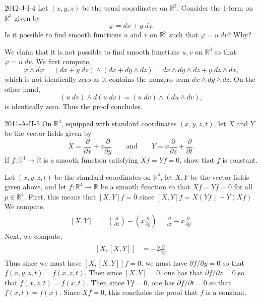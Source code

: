 \documentclass{article}
\begin{document}
	
	\begin{prb}{2012-J-I-4}
		Let $(x, y, z)$ be the usual coordinates on $\mathbb{R}^{3}$. Consider the 1-form on $\mathbb{R}^{3}$ given by 
		\begin{equation*}
			\varphi = dx + y\;dz. 
		\end{equation*}
		Is it possible to find smooth functions $u$ and $v$ on $\mathbb{R}^{3}$ such that $\varphi = u\;dv$? Why? 
	\end{prb}
	We claim that it is not possible to find smooth functions $u, v$ on $\mathbb{R}^{3}$ so that $\varphi = u\;dv$. We first compute, 
	\begin{equation*}
		\varphi \wedge d\varphi = (dx + y\;dz) \wedge (dx + dy \wedge dz) = dx \wedge dy \wedge dz + y\;dz \wedge dx, 
	\end{equation*}
	which is not identically zero as it contains the nonzero term $dx \wedge dy \wedge dz$. On the other hand, 
	\begin{equation*}
		(u\;dv) \wedge d(u\;dv) = (u\;dv) \wedge (du \wedge dv), 
	\end{equation*}
	is identically zero. Thus the proof concludes. 
	
	\begin{prb}{2011-A-II-5}
		On $\mathbb{R}^{4}$, equipped with standard coordinates $(x, y, z, t)$, let $X$ and $Y$ be the vector fields given by 
		\begin{equation*}
			X = \frac{\partial}{\partial x} + z\frac{\partial}{\partial y} \qquad \text{and} \qquad Y = x\frac{\partial}{\partial z} + \frac{\partial}{\partial t}. 
		\end{equation*}
		If $f: \mathbb{R}^{4} \to \mathbb{R}$ is a smooth function satisfying $Xf = Yf = 0$, show that $f$ is constant. 
	\end{prb}
	Let $(x, y, z, t)$ be the standard coordinates on $\mathbb{R}^{4}$, let $X, Y$ be the vector fields given above, and let $f: \mathbb{R}^{4} \to \mathbb{R}$ be a smooth function so that $Xf = Yf = 0$ for all $p \in \mathbb{R}^{4}$. First, this means that $[X, Y]f = 0$ since  $[X, Y]f = X(Yf) - Y(Xf)$. We compute, 
	\begin{align*}
		\begin{split}
			[X, Y] &= \left(\frac{\partial}{\partial z}\right) - \left(x\frac{\partial}{\partial y}\right) = \frac{\partial}{\partial z} - x\frac{\partial}{\partial y}. 
		\end{split}
	\end{align*}
	Next, we compute, 
	\begin{align*}
		\begin{split}
			[X,[X,Y]] &= -2\frac{\partial}{\partial y}. 
		\end{split}
	\end{align*}
	Thus since we must have $[X,[X,Y]]f = 0$, we must have $\partial f/\partial y = 0$ so that $f(x, y,z,t) = f(x,z,t)$. Then since $[X,Y] = 0$, one has that $\partial f/\partial z = 0$ so that $f(x,z,t) = f(x,t)$. Then since $Yf = 0$, one has $\partial f/\partial t = 0$ so that $f(x,t) = f(x)$. Since $Xf = 0$, this concludes the proof that $f$ is a constant. 
	
\end{document}
